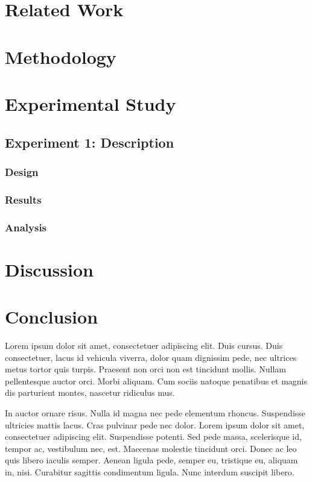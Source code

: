 \documentclass[12pt]{report}
\begin{document}
\chapter{Related Work}

\chapter{Methodology}

\chapter{Experimental Study}

\section{Experiment 1: Description}

\subsection{Design}

\subsection{Results}

\subsection{Analysis}

\chapter{Discussion}

\chapter{Conclusion}\label{chap:conclusion}

Lorem ipsum dolor sit amet, consectetuer adipiscing elit.  Duis cursus.
Duis consectetuer, lacus id vehicula viverra, dolor quam dignissim pede,
nec ultrices metus tortor quis turpis.
Praesent non orci non est tincidunt mollis.
Nullam pellentesque auctor orci.
Morbi aliquam.
Cum sociis natoque penatibus et magnis dis parturient montes, nascetur
ridiculus mus.

In auctor ornare risus.
Nulla id magna nec pede elementum rhoncus.
Suspendisse ultricies mattis lacus.
Cras pulvinar pede nec dolor.
Lorem ipsum dolor sit amet, consectetuer adipiscing elit.
Suspendisse potenti.
Sed pede massa, scelerisque id, tempor ac, vestibulum nec, est.
Maecenas molestie tincidunt orci.
Donec ac leo quis libero iaculis semper.
Aenean ligula pede, semper eu, tristique eu, aliquam in, nisi.
Curabitur sagittis condimentum ligula.
Nunc interdum suscipit libero.
\end{document}

